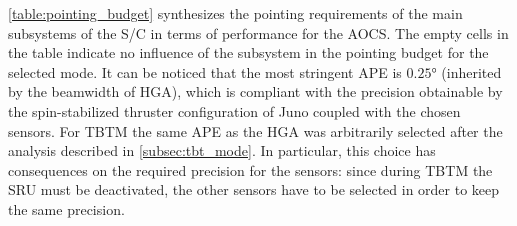 \autoref{table:pointing_budget} synthesizes the pointing requirements of the main subsystems of the S/C in terms of performance for the AOCS.
The empty cells in the table indicate no influence of the subsystem in the pointing budget for the selected mode.
It can be noticed that the most stringent APE is $0.25$° (inherited by the beamwidth of HGA), which is compliant with the precision obtainable by the spin-stabilized thruster configuration of Juno coupled with the chosen sensors.
For TBTM the same APE as the HGA was arbitrarily selected after the analysis described in \autoref{subsec:tbt_mode}.
In particular, this choice has consequences on the required precision for the sensors: since during TBTM the SRU must be deactivated, the other sensors have to be selected in order to keep the same precision.